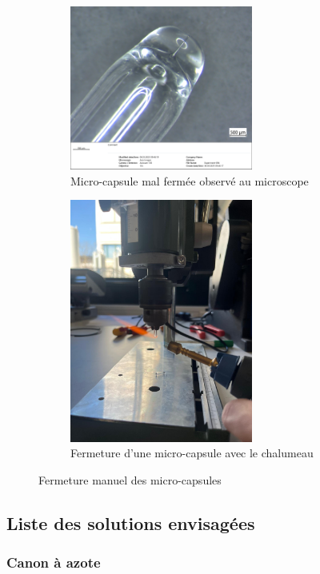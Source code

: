 \begin{figure}
    \centering
    \begin{subfigure}[b]{0.4\textwidth}
        \includegraphics[width=6cm]{Images/Illustrations/CDH/MicroCapsule_trou.jpg}
        \caption{Micro-capsule mal fermée observé au microscope}
        \label{fig:trou_microcapsule}
    \end{subfigure}
    \begin{subfigure}[b]{0.4\textwidth}
        \includegraphics[width=6cm]{Images/Illustrations/CDH/Fermeture_capsule.jpg}
        \caption{Fermeture d'une micro-capsule avec le chalumeau}
        \label{fig:chalumeau}
    \end{subfigure}
    \caption{Fermeture manuel des micro-capsules}
    \label{fig:fermeture_microcapsule}
\end{figure}




\subsection{Liste des solutions envisagées}
\subsubsection{Canon à azote}
